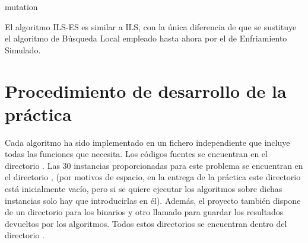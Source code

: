 \documentclass[10pt,a4paper]{article}
\begin{document}
\begin{algorithm}[H]
	\caption{mutation}
\end{algorithm}

El algoritmo ILS-ES es similar a ILS, con la única diferencia de que se sustituye el algoritmo de Búsqueda Local empleado hasta ahora por el de Enfriamiento Simulado.







\section{Procedimiento de desarrollo de la práctica}

Cada algoritmo ha sido implementado en un fichero independiente que incluye todas las funciones que necesita. Los códigos fuentes se encuentran en el directorio . Las 30 instancias proporcionadas para este problema se encuentran en el directorio , (por motivos de espacio, en la entrega de la práctica este directorio está inicialmente vacío, pero si se quiere ejecutar los algoritmos sobre dichas instancias solo hay que introducirlas en él). Además, el proyecto también dispone de un directorio  para los binarios y otro llamado  para guardar los resultados devueltos por los algoritmos. Todos estos directorios se encuentran dentro del directorio .
\end{document}
